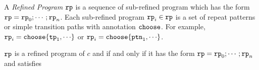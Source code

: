 \begin{enumerate}
A \emph{Refined Program}
$\mathtt{rp}$ is a sequence of
sub-refined program which
has the form $\mathtt{rp} = \mathtt{rp}_0; \cdots; \mathtt{rp}_n$.
Each sub-refined program
$\mathtt{rp}_i \in \mathtt{rp}$ is
a set of repeat patterns or simple transition paths with annotation $\mathtt{choose}$.
For example, $\rprog_i = \rpchoose{\tpath_1, \cdots}$ or
$\rprog_i = \rpchoose{\rpattern_1, \cdots}$.
\begin{defn}
  \label{def:refined-prog}
  $\mathtt{rp}$  is a refined program of $c$ and if and only if it has the form $ \mathtt{rp} = \mathtt{rp}_0; \cdots; \mathtt{rp}_n$
  and  satisfies

\end{defn}
\end{enumerate}
